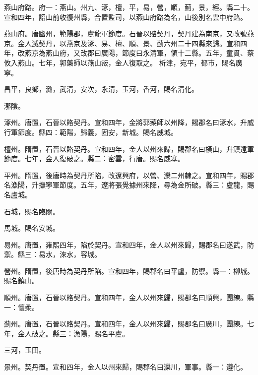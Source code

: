 \begin{pinyinscope}
 燕山府路。府一：燕山。州九、涿，檀，平，易，營，順，薊，景，經。縣二十。宣和四年，詔山前收復州縣，合置監司，以燕山府路為名，山後別名雲中府路。



 燕山府。唐幽州，範陽郡，盧龍軍節度。石晉以賂契丹，契丹建為南京，又改號燕京。金人滅契丹，以燕京及涿、易、檀、順、景、薊六州二十四縣來歸。宣和四年，改燕京為燕山府，又改郡曰廣陽，節度曰永清軍，領十二縣。五年，童貫、蔡攸入燕山。七年，郭藥師以燕山叛，金人復取之。
 析津，宛平，都市，賜名廣寧。



 昌平，良鄉，潞，武清，安次，永清，玉河，香河，賜名清化。



 漷陰。



 涿州。唐置，石晉以賂契丹。宣和四年，金將郭藥師以州降，賜郡名曰涿水，升威行軍節度。縣四：範陽，歸義，固安，新城。賜名威城。



 檀州。隋置，石晉以賂契丹。宣和四年，金人以州來歸，賜郡名曰橫山，升鎮遠軍節度。七年，金人復破之。縣二：密雲，行唐。賜名威塞。



 平州。隋置，後唐時為契丹所陷，改遼興府，以營、灤二州隸之。宣和四年，賜郡名漁陽，升撫寧軍節度。五年，遼將張覺據州來降，尋為金所破。縣三：盧龍，賜名盧城。



 石城，賜名臨關。



 馬城。賜名安城。



 易州。唐置，雍熙四年，陷於契丹。宣和四年，金人以州來歸，賜郡名曰遂武，防禦。縣三：易水，淶水，容城。



 營州。隋置，後唐時為契丹所陷。宣和四年，賜郡名曰平盧，防禦。縣一：柳城。賜名鎮山。



 順州。唐置，石晉以賂契丹。宣和四年，金人以州來歸，賜郡名曰順興，團練。縣一：懷柔。



 薊州。唐置，石晉以賂契丹。宣和四年，金人以州來歸，賜郡名曰廣川，團練。七年，金人破之。縣三：漁陽，賜名平盧。



 三河，玉田。



 景州。契丹置。宣和四年，金人以州來歸，賜郡名曰灤川，軍事。縣一：遵化。




\end{pinyinscope}
